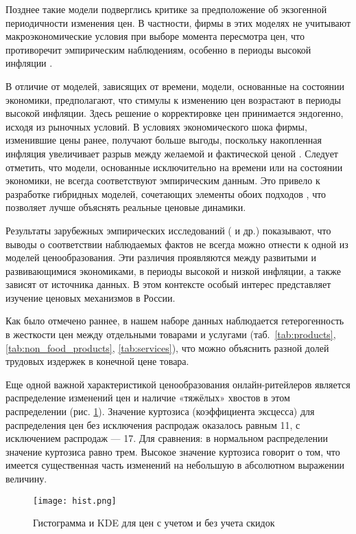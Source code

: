 Позднее такие модели подверглись критике за предположение об экзогенной периодичности изменения цен. В частности, фирмы в этих моделях не учитывают макроэкономические условия при выборе момента пересмотра цен, что противоречит эмпирическим наблюдениям, особенно в периоды высокой инфляции \cite{Barros2009, gagnon2009, NyawoRankin2016}.

В отличие от моделей, зависящих от времени, модели, основанные на состоянии экономики, предполагают, что стимулы к изменению цен возрастают в периоды высокой инфляции. Здесь решение о корректировке цен принимается эндогенно, исходя из рыночных условий. В условиях экономического шока фирмы, изменившие цены ранее, получают больше выгоды, поскольку накопленная инфляция увеличивает разрыв между желаемой и фактической ценой \cite{Dotsey1999, golosov2007}. Следует отметить, что модели, основанные исключительно на времени или на состоянии экономики, не всегда соответствуют эмпирическим данным. Это привело к разработке гибридных моделей, сочетающих элементы обоих подходов \cite{Nakamura2008}, что позволяет лучше объяснять реальные ценовые динамики.

Результаты зарубежных эмпирических исследований (\cite{gagnon2009, KlenowKryvtsov2008} и др.) показывают, что выводы о соответствии наблюдаемых фактов не всегда можно отнести к одной из моделей ценообразования. Эти различия проявляются между развитыми и развивающимися экономиками, в периоды высокой и низкой инфляции, а также зависят от источника данных. В этом контексте особый интерес представляет изучение ценовых механизмов в России.

Как было отмечено раннее, в нашем наборе данных наблюдается гетерогенность в жесткости цен между отдельными товарами и услугами (таб.~\ref{tab:products}, \ref{tab:non_food_products}, \ref{tab:services}), что можно объяснить разной долей трудовых издержек в конечной цене товара.

Еще одной важной характеристикой ценообразования онлайн-ритейлеров является распределение изменений цен и наличие «тяжёлых» хвостов в этом распределении (рис. \ref{fig:hist}). Значение куртозиса  (коэффициента эксцесса) для распределения цен без исключения распродаж оказалось равным 11, с исключением распродаж — 17. Для сравнения: в нормальном распределении значение куртозиса равно трем. Высокое значение куртозиса говорит о том, что имеется существенная часть изменений на небольшую в абсолютном выражении величину.

\begin{figure}[h!]
	\centering
	\texttt{[image: hist.png]} %
	\caption{Гистограмма и KDE для цен с учетом и без учета скидок}
	\label{fig:hist}
\end{figure}


